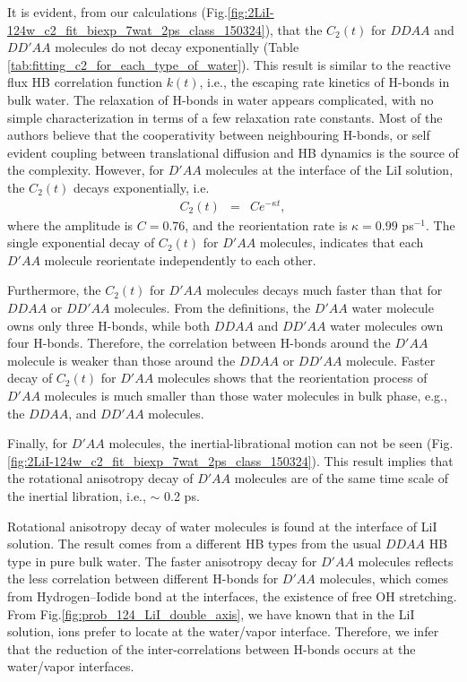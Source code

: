 It is evident, from our calculations (Fig.\space\ref{fig:2LiI-124w_c2_fit_biexp_7wat_2ps_class_150324}), that the $C_2(t)$ for $DDAA$ and $DD'AA$ molecules do not decay exponentially (Table \ref{tab:fitting_c2_for_each_type_of_water}).
This result is similar to the reactive flux HB correlation function $k(t)$, i.e., 
the escaping rate kinetics of H-bonds in bulk water. \cite{Luzar1996} 
The relaxation of H-bonds in water appears complicated, with no simple characterization in terms of a few relaxation rate constants. 
Most of the authors believe that the cooperativity between neighbouring H-bonds, \cite{Sciortino1989, Ohmine1995} or 
self evident coupling between translational diffusion and HB dynamics is the source of the complexity. \cite{Luzar1996} 
However, for $D'AA$ molecules at the interface of the LiI solution,
the $C_2(t)$ decays exponentially, i.e.
\begin{eqnarray}
  C_2(t) &=& C e^{-{\kappa}t},
\label{eq:C_2_D_prime_AA}
\end{eqnarray}
where the amplitude is $C=0.76$, and the reorientation rate is $\kappa = 0.99$ ps$^{-1}$.
The single exponential decay of $C_2(t)$ for $D'AA$ molecules, indicates that each $D'AA$  molecule reorientate independently to each other. 

Furthermore, the $C_2(t)$ for $D'AA$ molecules decays much faster than that for $DDAA$ or $DD'AA$ molecules.
From the definitions, the $D'AA$ water molecule owns only three H-bonds, while both $DDAA$ and $DD'AA$ water molecules own four H-bonds.
Therefore, the correlation between H-bonds around the $D'AA$ molecule is weaker than those around the $DDAA$ or $DD'AA$ molecule. 
Faster decay of $C_2(t)$ for $D'AA$ molecules shows that the reorientation process of $D'AA$
molecules is much smaller than those water molecules in bulk phase, e.g., the $DDAA$, and $DD'AA$ molecules.

Finally, for $D'AA$ molecules, the inertial-librational motion can not be seen (Fig.\space\ref{fig:2LiI-124w_c2_fit_biexp_7wat_2ps_class_150324}). 
This result implies that the rotational anisotropy decay of $D'AA$ molecules
are of the same time scale of the inertial libration, i.e., $\sim$ 0.2 ps.

Rotational anisotropy decay of water molecules is found at the interface of LiI solution. 
The result comes from a different HB types from the usual $DDAA$ HB type in pure bulk water.
The faster anisotropy decay for $D'AA$ molecules reflects the less correlation between different H-bonds for $D'AA$ molecules, which comes from Hydrogen--Iodide bond at the interfaces, the existence of free OH stretching.
From Fig.\space\ref{fig:prob_124_LiI_double_axis}, we have known that in the LiI solution, 
\I ions prefer to locate at the water/vapor interface.  
Therefore, we infer that the reduction of the inter-correlations between H-bonds occurs at the water/vapor interfaces. 

